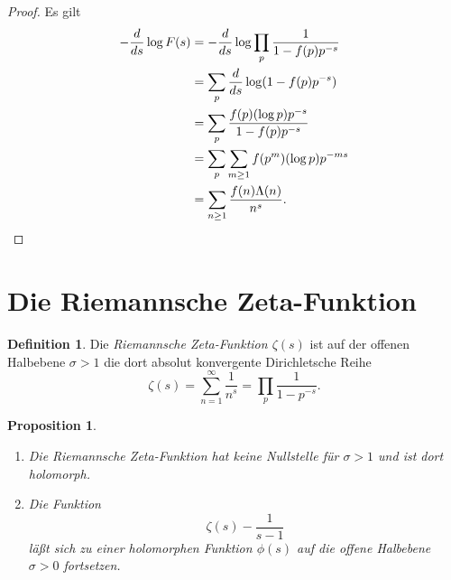 \documentclass[a4paper,twoside,openright]{report}
\newtheorem{prop}[thm]{Proposition}
\theoremstyle{definition}
\newtheorem{dfn}[thm]{Definition}
\theoremstyle{remark}
\begin{document}
\begin{proof}
  Es gilt
  \[
    \begin{split}
      - \frac d{ds} \log F(s)
      & = - \frac{d}{ds} \log \prod_p \frac{1}{1 - f(p) p^{-s}}
      \\
      & = \sum_p \frac{d}{ds} \log(1 - f(p) p^{-s})
      \\
      & = \sum_p \frac{f(p) (\log p) p^{-s}}{1 - f(p) p^{-s}}
      \\
      & = \sum_p \sum_{m \ge 1} f(p^m) (\log p) p^{-ms}
      \\
      & = \sum_{n \ge 1} \frac{f(n) \Lambda(n)}{n^s}.
      \qedhere
    \end{split}
  \]
\end{proof}

\section{Die Riemannsche Zeta-Funktion}

\begin{dfn}
  Die \emph{Riemannsche Zeta-Funktion $\zeta(s)$} ist auf der offenen Halbebene $\sigma > 1$ 
  die dort absolut konvergente Dirichletsche Reihe 
  \[
    \zeta(s) = \sum_{n = 1}^\infty \frac 1 {n^s} = \prod_p \frac 1 {1 - p^{-s}}.
  \] 
\end{dfn}

\begin{prop}
  \begin{enumerate}
  \item
    \label{it:zeta1}
    Die Riemannsche Zeta-Funktion hat keine Nullstelle für $\sigma > 1$ und ist dort
    holomorph.
  \item
    \label{it:zeta2}
    Die Funktion
    \[
      \zeta(s) - \frac 1 {s - 1}
    \]
    läßt sich zu einer holomorphen Funktion $\phi(s)$ auf die offene
    Halbebene $\sigma > 0$ fortsetzen.
  \end{enumerate}
\end{prop}
\end{document}
